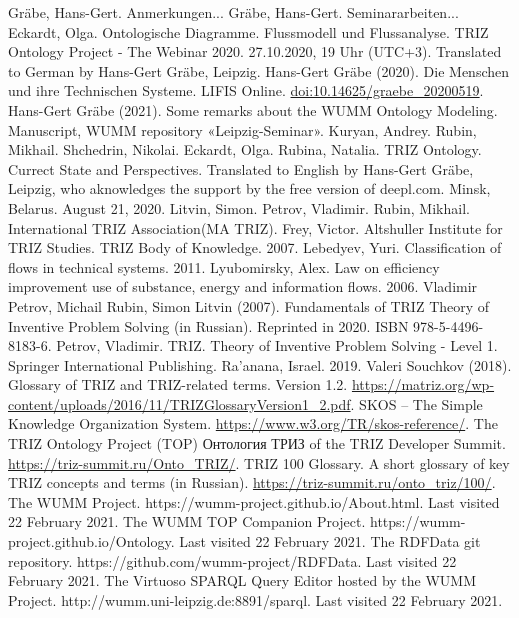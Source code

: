 \documentclass[a4paper,11pt]{article}
\begin{document}
\begin{thebibliography}{...}
    \raggedright
     Gräbe, Hans-Gert. Anmerkungen...
     Gräbe, Hans-Gert. Seminararbeiten...
     Eckardt, Olga. Ontologische Diagramme. Flussmodell und Flussanalyse. TRIZ Ontology Project - The Webinar 2020. 27.10.2020, 19 Uhr (UTC+3). Translated to German by Hans-Gert Gräbe, Leipzig. 
     Hans-Gert Gräbe (2020).  Die Menschen und ihre Technischen Systeme. LIFIS Online.
        \url{doi:10.14625/graebe_20200519}.
     Hans-Gert Gräbe (2021).  Some remarks about the WUMM Ontology Modeling.  Manuscript, WUMM repository «Leipzig-Seminar». 
     Kuryan, Andrey. Rubin, Mikhail. Shchedrin, Nikolai. Eckardt, Olga. Rubina, Natalia. TRIZ Ontology. Currect State and Perspectives. Translated to English by Hans-Gert Gräbe, Leipzig, who aknowledges the support by the free version of deepl.com. Minsk, Belarus. August 21, 2020.
     Litvin, Simon. Petrov, Vladimir. Rubin, Mikhail. International TRIZ Association(MA TRIZ). Frey, Victor. Altshuller Institute for TRIZ Studies. TRIZ Body of Knowledge. 2007.
     Lebedyev, Yuri. Classification of flows in technical systems. 2011.
     Lyubomirsky, Alex. Law on efficiency improvement use of substance, energy and information flows. 2006.
     Vladimir Petrov, Michail Rubin, Simon Litvin (2007). Fundamentals of TRIZ Theory of Inventive Problem Solving (in Russian). Reprinted in 2020. ISBN 978-5-4496-8183-6.
     Petrov, Vladimir. TRIZ. Theory of Inventive Problem Solving - Level 1. Springer International Publishing. Ra'anana, Israel. 2019.
     Valeri Souchkov (2018).  Glossary of TRIZ and TRIZ-related terms. Version 1.2.
        \url{https://matriz.org/wp-content/uploads/2016/11/TRIZGlossaryVersion1_2.pdf}. 
     SKOS -- The Simple Knowledge Organization System.
        \url{https://www.w3.org/TR/skos-reference/}.
     The TRIZ Ontology Project (TOP) \foreignlanguage{russian}{Онтология ТРИЗ} of the TRIZ Developer Summit.
        \url{https://triz-summit.ru/Onto_TRIZ/}.
     TRIZ 100 Glossary. A short glossary of key TRIZ concepts and terms (in Russian).
        \url{https://triz-summit.ru/onto_triz/100/}.
     The WUMM Project. https://wumm-project.github.io/About.html. Last visited 22 February 2021.
     The WUMM TOP Companion Project. https://wumm-project.github.io/Ontology. Last visited 22 February 2021.
     The RDFData git repository. https://github.com/wumm-project/RDFData.  Last visited 22 February 2021.
     The Virtuoso SPARQL Query Editor hosted by the WUMM Project. http://wumm.uni-leipzig.de:8891/sparql. Last visited 22 February 2021. 
\end{thebibliography}
\end{document}
